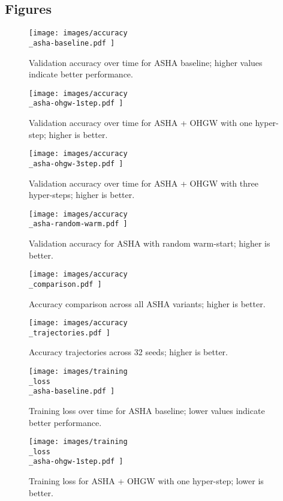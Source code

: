 \documentclass{article}
\begin{document}
\subsection{Figures}
\begin{figure}[H]
  \centering
  \texttt{[image:  images/accuracy\\\_asha-baseline.pdf ]}
  \caption{Validation accuracy over time for ASHA baseline; higher values indicate better performance.}
\end{figure}

\begin{figure}[H]
  \centering
  \texttt{[image:  images/accuracy\\\_asha-ohgw-1step.pdf ]}
  \caption{Validation accuracy over time for ASHA + OHGW with one hyper-step; higher is better.}
\end{figure}

\begin{figure}[H]
  \centering
  \texttt{[image:  images/accuracy\\\_asha-ohgw-3step.pdf ]}
  \caption{Validation accuracy over time for ASHA + OHGW with three hyper-steps; higher is better.}
\end{figure}

\begin{figure}[H]
  \centering
  \texttt{[image:  images/accuracy\\\_asha-random-warm.pdf ]}
  \caption{Validation accuracy for ASHA with random warm-start; higher is better.}
\end{figure}

\begin{figure}[H]
  \centering
  \texttt{[image:  images/accuracy\\\_comparison.pdf ]}
  \caption{Accuracy comparison across all ASHA variants; higher is better.}
\end{figure}

\begin{figure}[H]
  \centering
  \texttt{[image:  images/accuracy\\\_trajectories.pdf ]}
  \caption{Accuracy trajectories across 32 seeds; higher is better.}
\end{figure}

\begin{figure}[H]
  \centering
  \texttt{[image:  images/training\\\_loss\\\_asha-baseline.pdf ]}
  \caption{Training loss over time for ASHA baseline; lower values indicate better performance.}
\end{figure}

\begin{figure}[H]
  \centering
  \texttt{[image:  images/training\\\_loss\\\_asha-ohgw-1step.pdf ]}
  \caption{Training loss for ASHA + OHGW with one hyper-step; lower is better.}
\end{figure}
\end{document}
